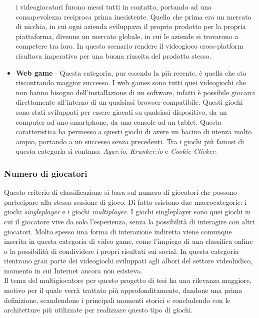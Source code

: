 \begin{itemize}
                    i videogiocatori furono messi tutti in contatto, portando ad una consapevolezza reciproca prima inesistente. Quello che prima era un mercato di nicchia, in cui
                    ogni azienda sviluppava il proprio prodotto per la propria piattaforma, divenne un mercato globale, in cui le aziende si trovarono a competere tra loro. In questo
                    scenario rendere il videogioco cross-platform risultava imperativo per una buona riuscita del prodotto stesso. 
                \item \textbf{Web game} - Questa categoria, pur essendo la più recente, è quella che sta riscontrando maggior successo. I web games sono tutti quei videogiochi
                    che non hanno bisogno dell'installazione di un software, infatti è possibile giocarci direttamente all'interno di un qualsiasi browser compatibile. Questi giochi 
                    sono stati sviluppati per essere giocati su qualsiasi dispositivo, da un computer ad uno smartphone, da una console ad un tablet. Questa caratteristica ha 
                    permesso a questi giochi di avere un bacino di utenza molto ampio, portando a un successo senza precedenti. Tra i giochi più famosi di questa categoria si contano: 
                    \textit{Agar.io}, \textit{Krunker.io} e \textit{Cookie Clicker}.
            \end{itemize} 

        \subsubsection{Numero di giocatori}
            Questo criterio di classificazione si basa sul numero di giocatori che possono partecipare alla stessa sessione di gioco. Di fatto esistono due macrocategorie: i
            giochi \textit{singleplayer} e i giochi \textit{multiplayer}. I giochi singleplayer sono quei giochi in cui il giocatore vive da solo l'esperienza, senza la 
            possibilità di interagire con altri giocatori. Molto spesso una forma di interazione indiretta viene comunque inserita in questa categoria di video game, come l'impiego
            di una classifica online o la possibilità di condividere i propri risultati sui social. In questa categoria rientrano gran parte dei videogiochi sviluppati agli albori
            del settore videoludico, momento in cui Internet ancora non esisteva.\\
            Il tema del multigiocatore per questo progetto di tesi ha una rilevanza maggiore, motivo per il quale verrà trattato più approfonditamente, dandone una prima definizione,
            scandendone i principali momenti storici e concludendo con le architetture più utilizzate per realizzare questo tipo di giochi.

